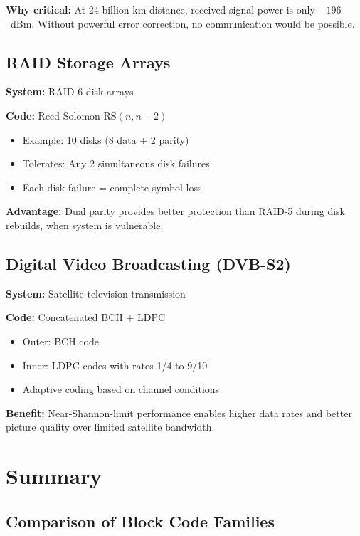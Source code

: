 \textbf{Why critical:} At 24 billion km distance, received signal power is only $-196$~dBm. Without powerful error correction, no communication would be possible.

\subsection{RAID Storage Arrays}

\textbf{System:} RAID-6 disk arrays

\textbf{Code:} Reed-Solomon RS$(n, n-2)$
\begin{itemize}
\item Example: 10 disks (8 data + 2 parity)
\item Tolerates: Any 2 simultaneous disk failures
\item Each disk failure = complete symbol loss
\end{itemize}

\textbf{Advantage:} Dual parity provides better protection than RAID-5 during disk rebuilds, when system is vulnerable.

\subsection{Digital Video Broadcasting (DVB-S2)}

\textbf{System:} Satellite television transmission

\textbf{Code:} Concatenated BCH + LDPC
\begin{itemize}
\item Outer: BCH code
\item Inner: LDPC codes with rates 1/4 to 9/10
\item Adaptive coding based on channel conditions
\end{itemize}

\textbf{Benefit:} Near-Shannon-limit performance enables higher data rates and better picture quality over limited satellite bandwidth.

\section{Summary}\label{summary}

\subsection{Comparison of Block Code Families}

